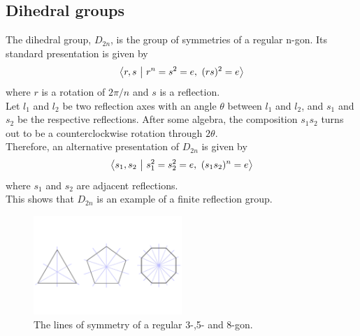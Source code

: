 \documentclass[../main.tex]{subfiles}
\begin{document}
\subsection{Dihedral groups}

The dihedral group, $D_{2n}$, is the group of symmetries of a regular n-gon. Its standard presentation is given by
\[
\left\langle r,s \ \middle| \  r^n = s^2 = e, \ (rs)^2 = e \right\rangle
\]
where $r$ is a rotation of $2\pi/n$ and $s$ is a reflection.\\

Let $l_{1}$ and $l_{2}$ be two reflection axes with an angle $\theta$ between $l_{1}$ and $l_{2}$, and $s_{1}$ and $s_{2}$ be the respective reflections. After some algebra, the composition $s_{1}s_{2}$ turns out to be a counterclockwise rotation through $2\theta$.\\

Therefore, an alternative presentation of $D_{2n}$ is given by
\[
\left\langle s_1,s_2 \ \middle| \ s_1^2 = s_2^2 = e, \ (s_1s_2)^n = e \right\rangle
\]
where $s_{1}$ and $s_{2}$ are adjacent reflections.\\

This shows that $D_{2n}$ is an example of a finite reflection group.

\begin{figure}[ht]
    \centering
    \includegraphics[width=0.5\textwidth]{polygons.pdf}
    \caption{The lines of symmetry of a regular 3-,5- and 8-gon.}
    \label{}
\end{figure}
\end{document}
